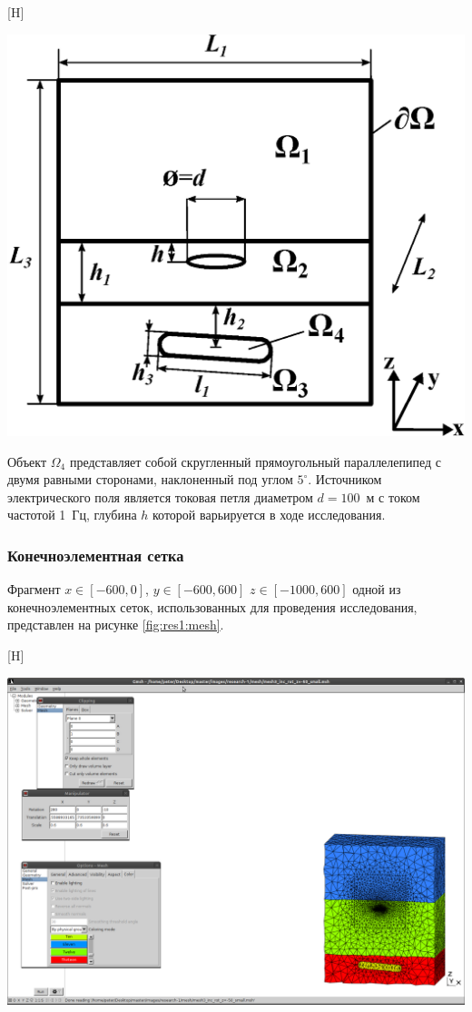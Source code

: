 \documentclass[a4paper,14pt]{article}
\makeatletter
\renewenvironment{figure}[1][\fps@figure]{
  \edef\@tempa{\noexpand\@float{figure}[#1]}
  \@tempa
  \addtocounter{foofigure}{1}
}{
  \end@float
}
\makeatother
\begin{document}
\begin{figure}[H]
	\centering
	\includegraphics[scale=0.7]{research-1/area_3layers_shift_3.eps}
	\caption{схематичное изображение расчетной области}
	\label{fig:res1:area}
\end{figure}

\noindent Объект $\Omega_4$ представляет собой скругленный прямоугольный параллелепипед с двумя равными сторонами, наклоненный под углом $5^{\circ}$. Источником электрического поля является токовая петля диаметром $d=100$~м с током частотой 1~Гц, глубина $h$ которой варьируется в ходе исследования.

\subsubsection{Конечноэлементная сетка}
Фрагмент $x \in [-600,0]$, $y \in [-600,600]$ $z \in [-1000,600]$ одной из конечноэлементных сеток, использованных для проведения исследования, представлен на рисунке \ref{fig:res1:mesh}.

\begin{figure}[H]
	\centering
	\includegraphics[trim=390mm 20mm 5mm 195mm,clip,scale=0.5]{research-1/mesh/mesh.png}
	\caption{фрагмент конечноэлементной сетки}
	\label{fig:res1:mesh}
\end{figure}
\end{document}
